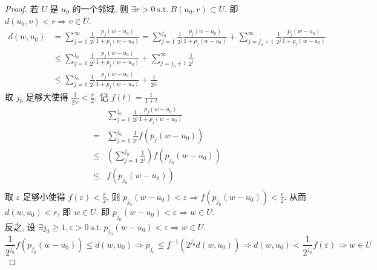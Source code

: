\documentclass[11pt]{ctexart}[UTF8]
\begin{document}
\begin{proof}
    若 $U$ 是 $u_{0}$ 的一个邻域, 则 $\exists r > 0\ \mathrm{s.t.}\ B(u_{0},r) \subset U$. 即 $d(u_{0}, v) < r \Longrightarrow v \in U$.
    \begin{equation*}
        \begin{aligned}
            d(w,u_{0}) &= \sum\limits_{j=1}^{\infty}\frac{1}{2^{j}}\frac{p_{j}(w-u_{0})}{1+p_{j}(w-u_{0})} = \sum\limits_{j=1}^{j_{0}}\frac{1}{2^{j}}\frac{p_{j}(w-u_{0})}{1+p_{j}(w-u_{0})} + \sum\limits_{j=j_{0}+1}^{\infty}\frac{1}{2^{j}}\frac{p_{j}(w-u_{0})}{1+p_{j}(w-u_{0})}\\
            &\leq \sum\limits_{j=1}^{j_{0}}\frac{1}{2^{j}}\frac{p_{j}(w-u_{0})}{1+p_{j}(w-u_{0})} + \sum\limits_{j=j_{0}+1}^{\infty}\frac{1}{2^{j}}\\
            &\leq \sum\limits_{j=1}^{j_{0}}\frac{1}{2^{j}}\frac{p_{j}(w-u_{0})}{1+p_{j}(w-u_{0})} + \frac{1}{2^{j_{0}}}
        \end{aligned}
    \end{equation*}
    取 $j_{0}$ 足够大使得 $\frac{1}{2^{j_{0}}} < \frac{r}{2}$, 记 $f(t) = \frac{1}{1+t}$
    \begin{equation*}
        \begin{aligned}
            &\sum\limits_{j=1}^{j_{0}}\frac{1}{2^{j}}\frac{p_{j}(w-u_{0})}{1+p_{j}(w-u_{0})}  \\
            = &\sum\limits_{j=1}^{j_{0}}\frac{1}{2^{j}} f(p_{j}(w-u_{0})) \\
            \leq &\left(\sum\limits_{j=1}^{j_{0}}\frac{1}{2^{j}}\right) f(p_{j_{0}}(w-u_{0}))\\
            \leq & f(p_{j_{0}}(w-u_{0})) \\
        \end{aligned}
    \end{equation*}
    取 $\varepsilon$ 足够小使得 $f(\varepsilon) < \frac{r}{2}$, 则 $p_{j_{0}}(w-u_{0}) < \varepsilon \Longrightarrow f(p_{j_{0}}(w-u_{0})) < \frac{r}{2}$. 从而 $d(w,u_{0}) < r$, 即 $w \in U$.
    即 $p_{j_{0}}(w-u_{0}) < \varepsilon \Longrightarrow w \in U$.\\
    反之, 设 $\exists j_{0} \geq 1, \varepsilon > 0\ \mathrm{s.t.}\ p_{j_{0}}(w-u_{0}) < \varepsilon \Longrightarrow w \in U$.
    \begin{equation*}
        \frac{1}{2^{j_{0}}}f(p_{j_{0}}(w-u_{0})) \leq d(w,u_{0}) \Longrightarrow p_{j_{0}} \leq f^{-1}(2^{j_{0}} d(w,u_{0})) \Longrightarrow d(w,u_{0}) < \frac{1}{2^{j_{0}}}f(\varepsilon) \Longrightarrow w \in U
    \end{equation*}
\end{proof}
\end{document}
